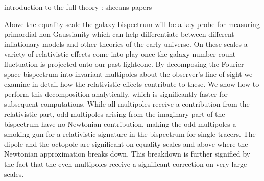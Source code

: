 introduction to the full theory : sheeans papers

Above the equality scale the galaxy bispectrum will be  a key probe for measuring primordial non-Gaussianity which can help differentiate between different inflationary models and other theories of the early universe. On these scales a variety of relativistic effects come into play once the galaxy number-count fluctuation is projected onto our past lightcone. By decomposing the Fourier-space bispectrum into invariant multipoles about the observer's line of sight we examine in detail how the relativistic effects contribute to these. We show how to perform this decomposition analytically, which is significantly faster for subsequent computations.  While all multipoles receive a contribution from the relativistic part, odd multipoles arising from the imaginary part of the bispectrum have no Newtonian contribution, making the odd multipoles a smoking gun for a relativistic signature in the bispectrum for single tracers.  The dipole and the octopole are significant on equality scales and above where the Newtonian approximation breaks down. This breakdown is further signified by the fact that the even multipoles receive a significant correction on very large scales.

